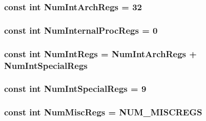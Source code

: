 \label{namespacePowerISA_a49908eb80616530afc519599ec46e42e}
\hypertarget{namespacePowerISA_a405c0abe85dc0da846c120e3b31f375c}{
\subsubsection[{NumIntArchRegs}]{\setlength{\rightskip}{0pt plus 5cm}const int {\bf NumIntArchRegs} = 32}}
\label{namespacePowerISA_a405c0abe85dc0da846c120e3b31f375c}
\hypertarget{namespacePowerISA_a66d89afd2b50d65bba7ccdae1dcb19fa}{
\subsubsection[{NumInternalProcRegs}]{\setlength{\rightskip}{0pt plus 5cm}const int {\bf NumInternalProcRegs} = 0}}
\label{namespacePowerISA_a66d89afd2b50d65bba7ccdae1dcb19fa}
\hypertarget{namespacePowerISA_a9c412b5118ce369570c156c4e156638a}{
\subsubsection[{NumIntRegs}]{\setlength{\rightskip}{0pt plus 5cm}const int {\bf NumIntRegs} = {\bf NumIntArchRegs} + {\bf NumIntSpecialRegs}}}
\label{namespacePowerISA_a9c412b5118ce369570c156c4e156638a}
\hypertarget{namespacePowerISA_aa4755d292c82d3f9a290e04202de41de}{
\subsubsection[{NumIntSpecialRegs}]{\setlength{\rightskip}{0pt plus 5cm}const int {\bf NumIntSpecialRegs} = 9}}
\label{namespacePowerISA_aa4755d292c82d3f9a290e04202de41de}
\hypertarget{namespacePowerISA_a568d4aa96dd7cd963f3b1b1b0446c9c6}{
\subsubsection[{NumMiscRegs}]{\setlength{\rightskip}{0pt plus 5cm}const int {\bf NumMiscRegs} = NUM\_\-MISCREGS}}
